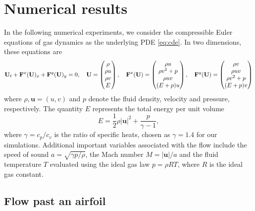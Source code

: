 \documentclass[a4paper]{article}
\numberwithin{equation}{section}
\numberwithin{equation}{section}
\theoremstyle{definition}
\theoremstyle{myremarkstyle}
\newcommand{\U}{{\bf U}}		%
\newcommand{\vel}{\mathbf{u}}
\newcommand{\F}{{\bf F}}
\begin{document}
\section{Numerical results}
\label{sec:num}
In the following numerical experiments, we consider the compressible Euler equations of gas dynamics as the underlying PDE \eqref{eq:cde}. In two dimensions, these equations are 
\begin{equation}
\label{eq:euler2D}
\U_t + \F^x(\U)_x + \F^y(\U)_y = 0,  \quad
\U = \begin{pmatrix}
\rho \\
\rho u \\
\rho v\\
E
\end{pmatrix}, \quad \F^x(\U) = \begin{pmatrix}
\rho u \\
\rho v^2 + p \\
\rho uv \\
(E + p) u
\end{pmatrix}, \quad \F^y(\U) = \begin{pmatrix}
\rho v \\
\rho uv \\
\rho v^2 + p \\
(E + p) v
\end{pmatrix}
\end{equation}
where $\rho, \vel = (u,v)$ and $p$ denote the fluid density, velocity and pressure, respectively. The quantity $E$ represents the total energy per unit volume
\[
E = \frac{1}{2} \rho |\vel|^2 + \frac{p}{\gamma -1},
\]
where $\gamma=c_p/c_v$ is the ratio of specific heats, chosen as $\gamma=1.4$ for our simulations. Additional important variables associated with the flow include the speed of sound $a = \sqrt{\gamma p/\rho}$, the Mach number $M=|\vel|/a$ and the fluid temperature $T$ evaluated using the ideal gas law $p = \rho R T$, where $R$ is the ideal gas constant.
\subsection{Flow past an airfoil}
\label{sec:aero}
\end{document}
